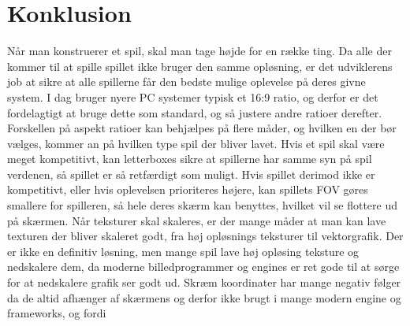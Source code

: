 \documentclass[main.tex]{Konklusion}
\begin{document}
\chapter{Konklusion}
Når man konstruerer et spil, skal man tage højde for en række ting. Da alle der kommer til at spille spillet ikke bruger den samme opløsning, er det udviklerens job at sikre at alle spillerne får den bedste mulige oplevelse på deres givne system.
I dag bruger nyere PC systemer typisk et 16:9 ratio, og derfor er det fordelagtigt at bruge dette som standard, og så justere andre ratioer derefter. Forskellen på aspekt ratioer kan behjælpes på flere måder, og hvilken en der bør vælges, kommer an på hvilken type spil der bliver lavet. Hvis et spil skal være meget kompetitivt, kan letterboxes sikre at spillerne har samme syn på spil verdenen, så spillet er så retfærdigt som muligt. Hvis spillet derimod ikke er kompetitivt, eller hvis oplevelsen prioriteres højere, kan spillets FOV gøres smallere for spilleren, så hele deres skærm kan benyttes, hvilket vil se flottere ud på skærmen. Når teksturer skal skaleres, er der mange måder at man kan lave texturen der bliver skaleret godt, fra høj opløsnings teksturer til vektorgrafik. Der er ikke en definitiv løsning, men mange spil lave høj opløsing teksture og nedskalere dem, da moderne billedprogrammer og engines er ret gode til at sørge for at nedskalere grafik ser godt ud.  Skræm koordinater har mange negativ følger da de altid afhænger af skærmens  og  derfor ikke brugt i mange modern engine og frameworks, og fordi 
\end{document}
